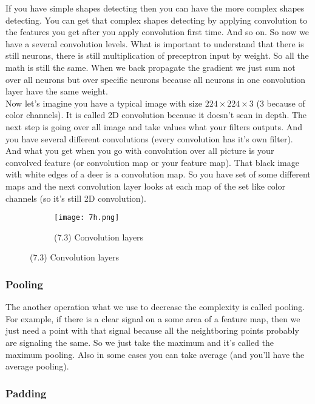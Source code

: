 If you have simple shapes detecting then you can have the more complex shapes detecting. You can get that complex shapes detecting by applying convolution to the features you get after you apply convolution first time. And so on. So now we have a several convolution levels. What is important to understand that there is still neurons, there is still multiplication of preceptron input by weight. So all the math is still the same. When we back propagate the gradient we just sum not over all neurons but over specific neurons because all neurons in one convolution layer have the same weight.\\
Now let's imagine you have a typical image with size $224\times224\times3$ (3 because of color channels). It is called 2D convolution because it doesn't scan in depth. The next step is going over all image and take values what your filters outputs. And you have several different convolutions (every convolution has it's own filter). And what you get when you go with convolution over all picture is your convolved feature (or convolution map or your feature map). That black image with white edges of a deer is a convolution map. So you have set of some different maps and the next convolution layer looks at each map of the set like color channels (so it's still 2D convolution).\\
\begin{figure}[h]
  \centering
  \begin{subfigure}[l]{0.6\linewidth}
    \texttt{[image: 7h.png]}
    \caption*{(7.3) Convolution layers}
  \end{subfigure}
\end{figure}

\vspace{-0.5cm}
\subsubsection*{Pooling}

The another operation what we use to decrease the complexity is called pooling. For example, if there is a clear signal on a some area of a feature map, then we just need a point with that signal because all the neightboring points probably are signaling the same. So we just take the maximum and it's called the maximum pooling. Also in some cases you can take average (and you'll have the average pooling).

\subsubsection*{Padding}


